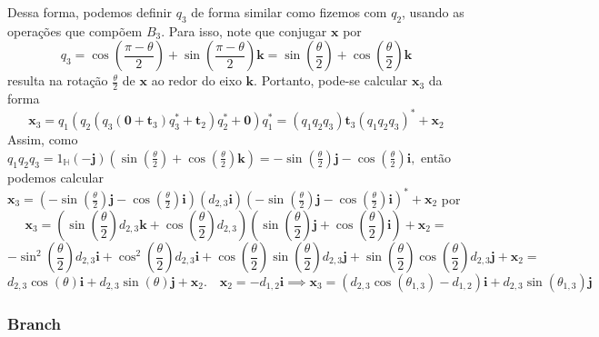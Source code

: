 \documentclass[a4paper,12pt]{report}
\theoremstyle{plain}
\theoremstyle{definition}
\begin{document}
	Dessa forma, podemos definir $q_3$ de forma similar como fizemos com $q_2$, usando as operações que compõem $B_3$. Para isso, note que conjugar $\mathbf x$ por
	$$q_3 = \cos(\frac {\pi - \theta} 2) + \sin(\frac {\pi - \theta} 2)\mathbf k = \sin(\frac \theta 2) + \cos(\frac \theta 2)\mathbf k$$ resulta na rotação $\frac \theta 2$ de $\mathbf x$ ao redor do eixo $\mathbf k$. Portanto, pode-se calcular $\mathbf x_3$ da forma
	$$
	\mathbf x_3 = q_1(q_2(q_3(\mathbf 0+\mathbf t_3)q_3^*+\mathbf t_2)q_2^* + \mathbf 0)q_1^* = (q_1q_2q_3)\mathbf t_3(q_1q_2q_3)^* + \mathbf x_2
	$$
	Assim, como $q_1q_2q_3 = 1_{\mathbb{H}}(-\mathbf j)(\sin(\frac \theta 2) + \cos(\frac \theta 2)\mathbf k) = -\sin(\frac \theta 2)\mathbf j - \cos(\frac \theta 2)\mathbf i,$ então podemos calcular $\mathbf x_3 = (-\sin(\frac \theta 2)\mathbf j - \cos(\frac \theta 2)\mathbf i)(d_{2,3}\mathbf i) (-\sin(\frac \theta 2)\mathbf j - \cos(\frac \theta 2)\mathbf i)^* + \mathbf x_2$ por 
	$$\mathbf x_3 =  (\sin(\frac \theta 2)d_{2,3}\mathbf k + \cos(\frac \theta 2)d_{2,3})(\sin(\frac \theta 2)\mathbf j + \cos(\frac \theta 2)\mathbf i) + \mathbf x_2 = $$
	$$-\sin^2(\frac \theta 2)d_{2,3}\mathbf i + \cos^2(\frac \theta 2)d_{2,3}\mathbf i +\cos(\frac \theta 2)\sin(\frac \theta 2)d_{2,3}\mathbf j + \sin(\frac \theta 2)\cos(\frac \theta 2)d_{2,3}\mathbf j + \mathbf x_2 = 
	$$
	$$
	d_{2,3}\cos(\theta)\mathbf i + d_{2,3}\sin(\theta)\mathbf j + \mathbf x_2. \quad \mathbf x_2 = -d_{1,2}\mathbf i \implies \mathbf x_3 = (d_{2,3}\cos(\theta_{1,3})-d_{1,2})\mathbf i + d_{2,3}\sin(\theta_{1,3})\mathbf j
	$$
	
	\subsubsection*{Branch}
	
\end{document}
